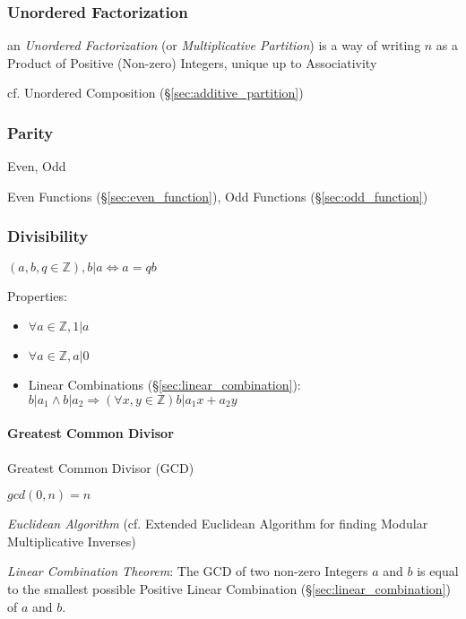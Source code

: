 \subsubsection{Unordered Factorization}\label{sec:unordered_factorization}

an \emph{Unordered Factorization} (or \emph{Multiplicative Partition}) is a way
of writing $n$ as a Product of Positive (Non-zero) Integers, unique up to
Associativity

cf. Unordered Composition (\S\ref{sec:additive_partition})



\subsubsection{Parity}\label{sec:parity}

Even, Odd

\fist Even Functions (\S\ref{sec:even_function}), Odd Functions
(\S\ref{sec:odd_function})



\subsubsection{Divisibility}\label{sec:divisibility}

$(a,b,q \in \mathbb{Z}), b|a \Leftrightarrow a = qb$

Properties:

\begin{itemize}
\item $\forall a \in \mathbb{Z}, 1|a$
\item $\forall a \in \mathbb{Z}, a|0$
\item Linear Combinations (\S\ref{sec:linear_combination}): $b|a_1
  \wedge b|a_2 \Rightarrow (\forall x,y \in \mathbb{Z})b|a_1 x + a_2
  y$
\end{itemize}



\paragraph{Greatest Common Divisor}\label{sec:gcd}\hfill

Greatest Common Divisor (GCD)

$gcd(0,n) = n$

\emph{Euclidean Algorithm} (cf. Extended Euclidean Algorithm for finding Modular
Multiplicative Inverses)

\emph{Linear Combination Theorem}: The GCD of two non-zero Integers
$a$ and $b$ is equal to the smallest possible Positive Linear
Combination (\S\ref{sec:linear_combination}) of $a$ and $b$.

